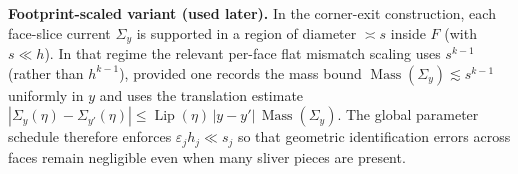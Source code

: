 \documentclass[11pt]{article}
\numberwithin{equation}{section}  %
\theoremstyle{plain}
\theoremstyle{definition}
\theoremstyle{remark}
\DeclareMathOperator{\Lip}{Lip}
\DeclareMathOperator{\Mass}{Mass}
\newcommand{\dist}{\mathrm{dist}}
\begin{document}
\noindent\textbf{Footprint-scaled variant (used later).} In the corner-exit construction, each face-slice current $\Sigma_y$ is supported in a region of diameter $\asymp s$ inside $F$ (with $s\ll h$).  In that regime the relevant per-face flat mismatch scaling uses $s^{k-1}$ (rather than $h^{k-1}$), provided one records the mass bound $\Mass(\Sigma_y)\lesssim s^{k-1}$ uniformly in $y$ and uses the translation estimate $|\Sigma_y(\eta)-\Sigma_{y'}(\eta)|\le \Lip(\eta)\,|y-y'|\,\Mass(\Sigma_y)$. The global parameter schedule therefore enforces $\varepsilon_j h_j\ll s_j$ so that geometric identification errors across faces remain negligible even when many sliver pieces are present.

\end{document}
